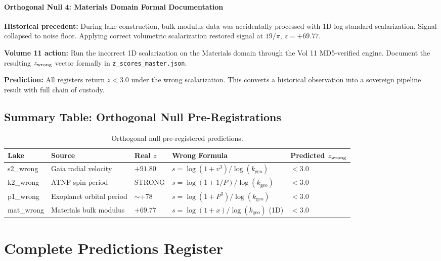 \documentclass[12pt,a4paper]{article}
\newcommand{\kgeo}{\ensuremath{k_{\mathrm{geo}}}}
\begin{document}
\paragraph{Orthogonal Null 4: Materials Domain Formal Documentation}

\textbf{Historical precedent:} During lake construction, bulk modulus data
was accidentally processed with 1D log-standard scalarization. Signal collapsed
to noise floor. Applying correct volumetric scalarization restored signal at
$19/\pi$, $z = +69.77$.

\textbf{Volume 11 action:} Run the incorrect 1D scalarization on the Materials
domain through the Vol 11 MD5-verified engine. Document the resulting
$z_{\rm wrong}$ vector formally in \texttt{z\_scores\_master.json}.

\textbf{Prediction:} All registers return $z < 3.0$ under the wrong
scalarization. This converts a historical observation into a sovereign pipeline
result with full chain of custody.

\subsection{Summary Table: Orthogonal Null Pre-Registrations}

\begin{table}[h!]
\centering
\caption{Orthogonal null pre-registered predictions.}
\begin{tabular}{l p{4.0cm} l p{4.5cm} l}
\toprule
\textbf{Lake} & \textbf{Source} & \textbf{Real $z$} &
\textbf{Wrong Formula} & \textbf{Predicted $z_{\rm wrong}$} \\
\midrule
s2\_wrong & Gaia radial velocity & $+91.80$ & $s = \log(1+v^3)/\log(\kgeo)$ & $< 3.0$ \\
k2\_wrong & ATNF spin period & STRONG & $s = \log(1+1/P)/\log(\kgeo)$ & $< 3.0$ \\
p1\_wrong & Exoplanet orbital period & $\sim+78$ & $s = \log(1+P^3)/\log(\kgeo)$ & $< 3.0$ \\
mat\_wrong & Materials bulk modulus & $+69.77$ & $s = \log(1+x)/\log(\kgeo)$ (1D) & $< 3.0$ \\
\bottomrule
\end{tabular}
\end{table}

\section{Complete Predictions Register}
\label{sec:predictions_register}
\end{document}
